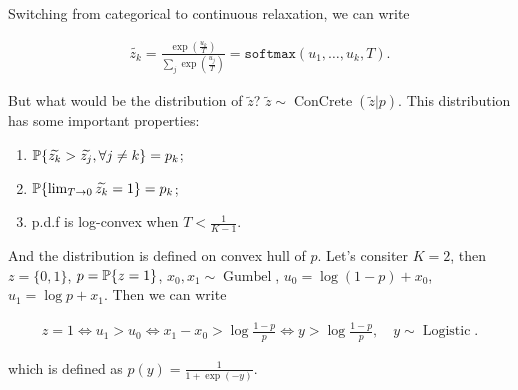 Switching from categorical to continuous relaxation, we can write

\begin{equation*}
    \begin{aligned}
        \widetilde{z_k} = \frac{\exp \left(\frac{u_k}{T} \right)}{\sum_j \exp \left(\frac{u_j}{T} \right)} = \texttt{softmax}(u_1, \ldots, u_k, T).
    \end{aligned}
\end{equation*}

But what would be the distribution of $\widetilde{z}$? $\widetilde{z} \sim \operatorname{ConCrete}(\widetilde{z} | p)$. This distribution has some important properties: 

\begin{enumerate}
    \item $\operatorname{\mathbb{P}}\{\widetilde{z_k} > \widetilde{z_j}, \forall j \neq k\} = p_k$; 
    \item $\operatorname{\mathbb{P}}\{\lim_{T \to 0} \widetilde{z_k} = 1\} = p_k$;
    \item p.d.f is log-convex when $T < \frac{1}{K -1}$. 
\end{enumerate}

And the distribution is defined on convex hull of $p$. Let's consiter $K = 2$, then $z = \{0, 1\}$, $p = \operatorname{\mathbb{P}}\{z = 1\}$, $x_0, x_1 \sim \operatorname{Gumbel}$, $u_0 = \log (1-p) + x_0$, $u_1 = \log p + x_1$. Then we can write

\begin{equation*}
    \begin{aligned}
        z = 1 \Leftrightarrow u_1 > u_0 \Leftrightarrow x_1 - x_0 > \log \frac{1-p}{p} \Leftrightarrow y > \log \frac{1-p}{p}, \quad y \sim \operatorname{Logistic}.
    \end{aligned}
\end{equation*}

which is defined as $p(y) = \frac{1}{1 + \exp(-y)}$.




